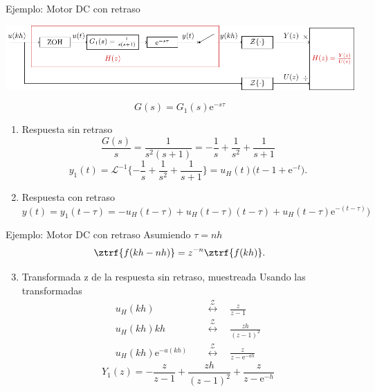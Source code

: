\documentclass[presentation,aspectratio=169]{beamer}
\begin{document}
\begin{frame}[label={sec:orgb732cc6}]{Ejemplo: Motor DC con retraso}
\begin{center}
\includegraphics[width=0.89\linewidth]{../../figures/invariant-sampling-dcmotor.pdf}
\end{center}
\[ G(s) = G_1(s)\mathrm{e}^{-s\tau}\]

\begin{enumerate}
\item \alert{Respuesta sin retraso} \[ \frac{G(s)}{s} = \frac{1}{s^2(s+1)} = -\frac{1}{s} + \frac{1}{s^2} + \frac{1}{s+1} \]
\[ y_1(t) = \mathcal{L}^{-1} \{-\frac{1}{s} + \frac{1}{s^2} + \frac{1}{s+1}\} = u_H(t)\big(t-1+\mathrm{e}^{-t}\big).\]
\item \alert{Respuesta con retraso} \(y(t) = y_1(t-\tau) =  -u_H(t-\tau) + u_H(t-\tau)(t-\tau) + u_H(t-\tau)\mathrm{e}^{-(t-\tau)}\big)\)
\end{enumerate}
\end{frame}

\begin{frame}[label={sec:orgad0ccbc}]{Ejemplo: Motor DC con retraso}
Asumiendo \(\tau = nh\)
\[ \ztrf{f(kh-nh)} = z^{-n}\ztrf{f(kh)}.\]
\begin{enumerate}
\setcounter{enumi}{2}
\item \alert{Transformada z de la respuesta sin retraso, muestreada} 
Usando las transformadas
\begin{align*}
u_H(kh) \quad &\overset{\mathcal{Z}}{\longleftrightarrow} \quad \frac{z}{z-1}\\
u_H(kh)kh \quad &\overset{\mathcal{Z}}{\longleftrightarrow} \quad \frac{zh}{(z-1)^2}\\
u_H(kh)\mathrm{e}^{-a(kh)} \quad &\overset{\mathcal{Z}}{\longleftrightarrow} \quad \frac{z}{z-\mathrm{e}^{-ah}}
\end{align*}
\[Y_1(z) = -\frac{z}{z-1} + \frac{zh}{(z-1)^2} + \frac{z}{z-\mathrm{e}^{-h}}\]
\end{enumerate}
\end{frame}
\end{document}
